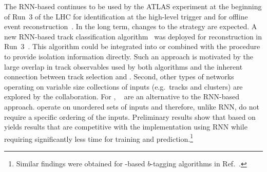 The RNN-based \tauid continues to be used by the ATLAS experiment at the
beginning of Run~3 of the LHC for identification at the high-level trigger and
for offline event reconstruction~\cite{ATL-PHYS-PUB-2022-044}. In the long term,
changes to the \tauid strategy are expected. A new RNN-based \tauhadvis track
classification algorithm~\cite{Maerker:2021hro} was deployed for \tauhadvis
reconstruction in Run~3~\cite{ATL-PHYS-PUB-2022-044}. This algorithm could be
integrated into or combined with the \tauid procedure to provide isolation
information directly. Such an approach is motivated by the large overlap in
track observables used by both algorithms and the inherent connection between
\tauhadvis track selection and \tauid. Second, other types of networks operating
on variable size collections of inputs (e.g.\ tracks and clusters) are explored
by the collaboration. For \tauid, \deepsets~\cite{NIPS2017_f22e4747} are an
alternative to the RNN-based approach. \deepsets operate on unordered sets of
inputs and therefore, unlike RNN, do not require a specific ordering of the
inputs. Preliminary results show that \tauid based on \deepsets yields results
that are competitive with the implementation using RNN while requiring
significantly less time for training and prediction.\footnote{Similar findings
  were obtained for \deepsets-based $b$-tagging algorithms in
  Ref.~\cite{ATL-PHYS-PUB-2020-014}.}




